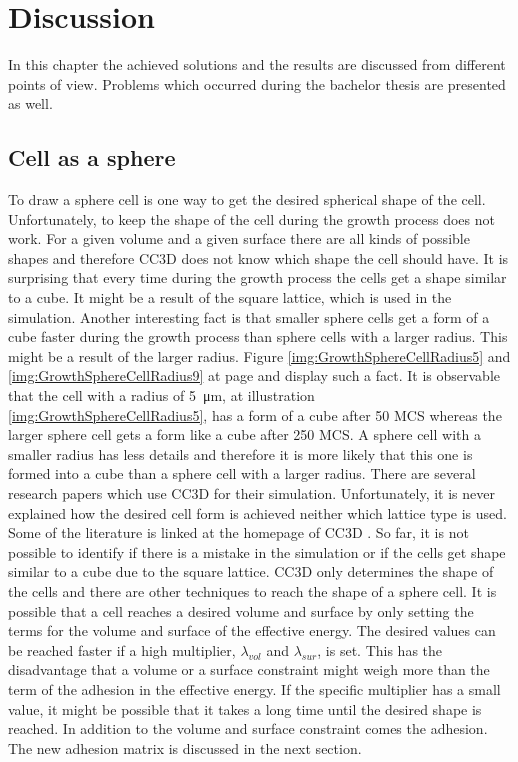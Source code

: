\chapter{Discussion}
In this chapter the achieved solutions and the results are discussed from different points of view. Problems which occurred during the bachelor thesis are presented as well.

\section{Cell as a sphere}
To draw a sphere cell is one way to get the desired spherical shape of the cell. Unfortunately, to keep the shape of the cell during the growth process does not work. For a given volume and a given surface there are all kinds of possible shapes and therefore \ac{CC3D} does not know which shape the cell should have. It is surprising that every time during the growth process the cells get a shape similar to a cube. It might be a result of the square lattice, which is used in the simulation. Another interesting fact is that smaller sphere cells get a form of a cube faster during the growth process than sphere cells with a larger radius. This might be a result of the larger radius. Figure \ref{img:GrowthSphereCellRadius5} and \ref{img:GrowthSphereCellRadius9} at page \pageref{img:GrowthSphereCellRadius5} and \pageref{img:GrowthSphereCellRadius9} display such a fact. It is observable that the cell with a radius of \SI{5}{\micro\metre}, at illustration \ref{img:GrowthSphereCellRadius5}, has a form of a cube after 50 \ac{MCS} whereas the larger sphere cell gets a form like a cube after 250 \ac{MCS}. A sphere cell with a smaller radius has less details and therefore it is more likely that this one is formed into a cube than a sphere cell with a larger radius. \newline
There are several research papers which use \ac{CC3D} for their simulation. Unfortunately, it is never explained how the desired cell form is achieved neither which lattice type is used. Some of the literature is linked at the homepage of \ac{CC3D} \cite{CC3D.org}. So far, it is not possible to identify if there is a mistake in the simulation or if the cells get shape similar to a cube due to the square lattice. \newline
\ac{CC3D} only determines the shape of the cells and there are other techniques to reach the shape of a sphere cell. It is possible that a cell reaches a desired volume and surface by only setting the terms for the volume and surface of the effective energy. The desired values can be reached faster if a high multiplier, $\lambda_{vol}$ and $\lambda_{sur}$, is set. This has the disadvantage that a volume or a surface constraint might weigh more than the term of the adhesion in the effective energy. If the specific multiplier has a small value, it might be possible that it takes a long time until the desired shape is reached. In addition to the volume and surface constraint comes the adhesion. The new adhesion matrix is discussed in the next section.


